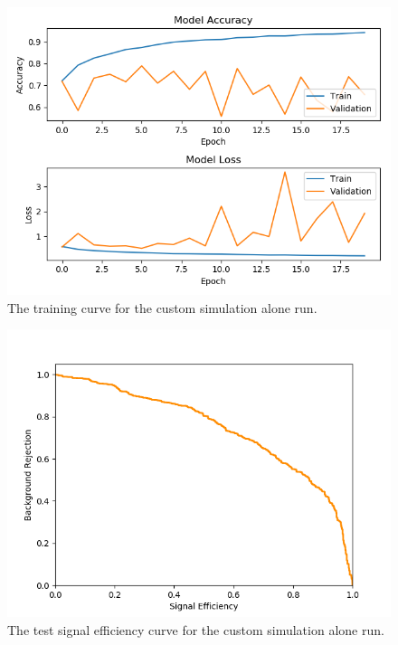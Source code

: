 \begin{figure}[] 
        \centering \includegraphics[width=\columnwidth]{figures/crabrun2trainlog.png}

        \caption{
                \label{fig:cr2_trainlog} The training curve for the custom simulation alone run.
        }
\end{figure}

\begin{figure}[] 
        \centering \includegraphics[width=\columnwidth]{figures/crabrun2_sigeff.png}

        \caption{
                \label{fig:cr2_sigeff} The test signal efficiency curve for the custom simulation alone run.
        }
\end{figure}

